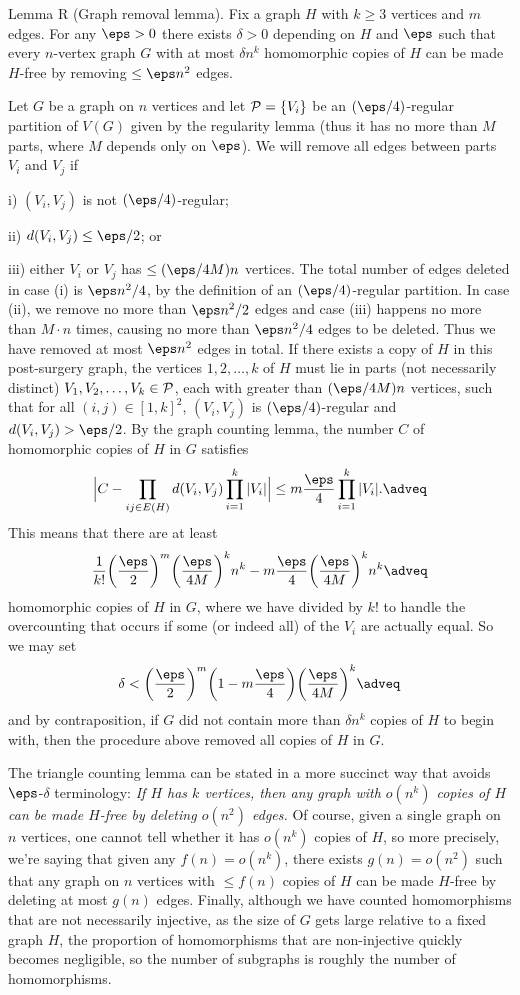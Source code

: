 \parenproclaim Lemma R (Graph removal lemma). Fix a graph $H$ with $k\geq 3$ vertices and $m$ edges. For any $\eps>0$
there exists
$\delta>0$ depending on $H$ and $\eps$
such that every $n$-vertex graph $G$ with at most $\delta n^k$ homomorphic copies of $H$ can be made
$H$-free by removing $\leq \eps n^2$ edges.

\proof Let $G$ be a graph on $n$ vertices and let
$\P = \{V_i\}$ be an $(\eps/4)$-regular partition
of $V(G)$ given by the regularity lemma (thus it has no more than $M$ parts, where $M$ depends only on $\eps$).
We will remove all edges between parts $V_i$ and $V_j$ if
\medskip
\item{i)} $(V_i,V_j)$ is not $(\eps/4)$-regular;
\smallskip
\item{ii)} $d(V_i,V_j)\leq \eps/2$; or
\smallskip
\item{iii)} either $V_i$ or $V_j$ has $\leq (\eps/4M)n$ vertices.
\medskip
The total number of edges deleted in case (i) is $\eps n^2/4$, by the definition of an $(\eps/4)$-regular partition.
In case (ii), we remove no more than $\eps n^2/2$ edges and case (iii) happens no more than $M\cdot n$ times,
causing no more than $\eps n^2/4$ edges to be deleted. Thus we have removed at most $\eps n^2$ edges in total.
If there exists a copy of $H$ in this post-surgery graph, the vertices $1,2,\ldots,k$ of $H$ must lie in
parts (not necessarily distinct) $V_1,V_2,\ldots,V_k\in \P$, each with greater than $(\eps/4M)n$ vertices,
such that for all $(i,j)\in [1,k]^2$, $(V_i,V_j)$ is $(\eps/4)$-regular and $d(V_i,V_j) > \eps/2$.
By the graph counting lemma, the number $C$ of homomorphic copies of $H$ in $G$ satisfies
$$\Big|C - \prod_{ij\in E(H)} d(V_i,V_j) \prod_{i=1}^k |V_i|\Big|\leq m{\eps\over 4} \prod_{i=1}^k |V_i|.\adveq$$
This means that there are at least
$$ {1\over k!}
\bigg({\eps\over 2}\bigg)^m \bigg({\eps\over 4M}\bigg)^k n^k - m{\eps\over 4}\bigg({\eps\over 4M}\bigg)^k n^k\adveq$$
homomorphic copies of $H$ in $G$, where we have divided by $k!$ to handle the overcounting that occurs if some
(or indeed all) of the $V_i$ are actually equal. So we may set
$$\delta < \bigg({\eps\over 2}\bigg)^m \bigg(1- m{\eps\over 4}\bigg)\bigg({\eps\over 4M}\bigg)^k\adveq$$
and by contraposition, if $G$ did not contain more than $\delta n^k$ copies of $H$ to begin with, then the procedure
above removed all copies of $H$ in $G$.\slug

The triangle counting lemma can be stated in a more succinct way that avoids $\eps$-$\delta$ terminology:
{\sl If $H$ has $k$ vertices, then any graph with $o(n^k)$ copies of $H$
can be made $H$-free by deleting $o(n^2)$ edges.}
Of course, given a single graph on $n$ vertices, one cannot tell whether it has $o(n^k)$ copies of $H$, so
more precisely, we're saying that given any $f(n) = o(n^k)$, there exists $g(n) = o(n^2)$ such that any graph
on $n$ vertices with $\leq f(n)$ copies of $H$ can be made $H$-free by deleting at most $g(n)$ edges. Finally,
although we have counted homomorphisms that are not necessarily injective, as the size of $G$ gets large relative
to a fixed graph $H$, the proportion of homomorphisms that are non-injective quickly becomes negligible, so the number
of subgraphs is roughly the number of homomorphisms.

